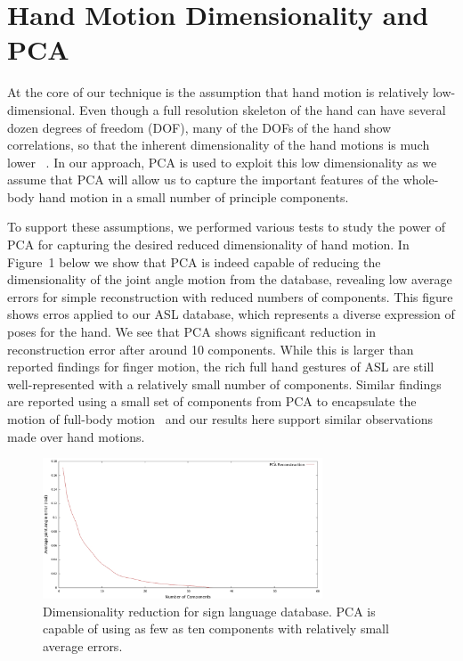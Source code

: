 \section{Hand Motion Dimensionality and PCA}

At the core of our technique is the assumption that hand motion is relatively low-dimensional.  Even though a full resolution skeleton of the hand can have several dozen degrees of freedom (DOF), many of the DOFs of the hand show correlations, so that the inherent dimensionality of the hand motions is much lower ~\cite{SanFlaSoe98,BraZha04,JoeOSu09}. In our approach, PCA is used to exploit this low dimensionality as we assume that PCA will allow us to capture the important features of the whole-body hand motion in a small number of principle components.  

To support these assumptions, we performed various tests to study the power of PCA for capturing the desired reduced dimensionality of hand motion. 
In Figure~1 below we show that PCA is indeed capable of reducing the dimensionality of the joint angle motion from the database, revealing low average errors for simple reconstruction with reduced numbers of components.  This figure shows erros applied to our ASL database, which represents a diverse expression of poses for the hand.  We see that PCA shows significant reduction in reconstruction error after around 10 components.  While this is larger than reported findings for finger motion, the rich full hand gestures of ASL are still well-represented with a relatively small number of components.
Similar findings are reported using a small set of components from PCA to encapsulate the motion of full-body motion~\cite{SafHodPol04} and our results here support similar observations made over hand motions.


\begin{figure}[!h]
  \centering
  \includegraphics[width=8.3cm]{images/PCA_alphabet_reconstruct.jpg}
  \caption{{\label{fig:pcaError}}Dimensionality reduction for sign language database.  PCA is capable of using as few as ten components with relatively small average errors.}
\end{figure}

